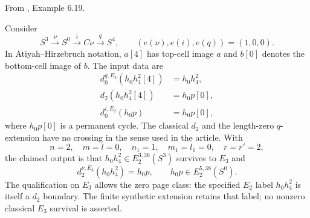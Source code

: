 \begin{proposition}
\label{paper:6.19}
\label{exam:Mahowald}
From \cite{LWX126}, Example 6.19.\par
Consider
\[
S^3\xrightarrow{\nu}S^0\xrightarrow{i}C\nu\xrightarrow{q}S^4,
\qquad (e(\nu),e(i),e(q))=(1,0,0).
\]
In Atiyah--Hirzebruch notation, $a[4]$ has top-cell image $a$ and $b[0]$ denotes the bottom-cell image of $b$. The input data are
\[
\begin{aligned}
d_0^{q,E_2}(h_0h_4^2[4])&=h_0h_4^2,\\
d_2(h_0h_4^2[4])&=h_0p[0],\\
d_0^{i,E_2}(h_0p)&=h_0p[0],
\end{aligned}
\]
where $h_0p[0]$ is a permanent cycle. The classical $d_2$ and the length-zero $q$-extension have no crossing in the sense used in the article. With
\[
n=2,\quad m=l=0,\quad n_1=1,\quad m_1=l_1=0,
\quad r=r'=2,
\]
the claimed output is that $h_0h_4^2\in E_2^{3,36}(S^3)$ survives to $E_3$ and
\[
d_2^{\nu,E_3}(h_0h_4^2)=h_0p,
\qquad h_0p\in E_2^{5,38}(S^0).
\]
The qualification on $E_3$ allows the zero page class: the specified
$E_2$ label $h_0h_4^2$ is itself a $d_2$ boundary. The finite synthetic
extension retains that label; no nonzero classical $E_3$ survival is asserted.
\end{proposition}
